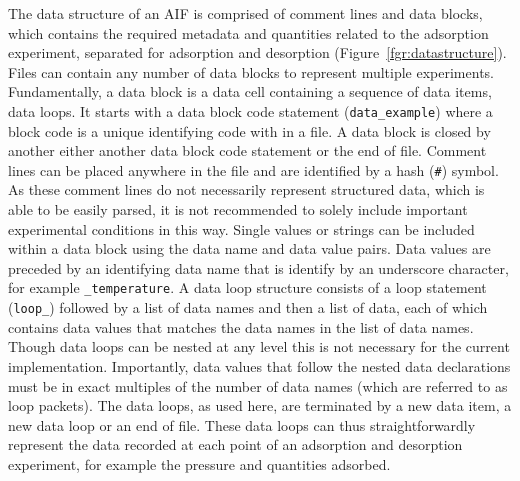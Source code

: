 \documentclass[journal=langd5,manuscript=article]{achemso}
\begin{document}
The data structure of an AIF is comprised of comment lines and data blocks, which contains the required metadata and quantities related to the adsorption experiment, separated for adsorption and desorption (Figure~\ref{fgr:datastructure}).
Files can contain any number of data blocks to represent multiple experiments.
Fundamentally, a data block is a data cell containing a sequence of data items, data loops.
It starts with a data block code statement (\texttt{data\_example}) where a block code is a unique identifying code with in a file.
A data block is closed by another either another data block code statement or the end of file.
Comment lines can be placed anywhere in the file and are identified by a hash (\texttt{\#}) symbol.
As these comment lines do not necessarily represent structured data, which is able to be easily parsed, it is not recommended to solely include important experimental conditions in this way.
Single values or strings can be included within a data block using the data name and data value pairs.
Data values are preceded by an identifying data name that is identify by an underscore character, for example \texttt{\_temperature}.
A data loop structure consists of a loop statement (\texttt{loop\_}) followed by a list of data names and then a list of data, each of which contains data values that matches the data names in the list of data names. 
Though data loops can be nested at any level this is not necessary for the current implementation.
Importantly, data values that follow the nested data declarations must be in exact multiples of the number of data names (which are referred to as loop packets).
The data loops, as used here, are terminated by a new data item, a new data loop or an end of file.
These data loops can thus straightforwardly represent the data recorded at each point of an adsorption and desorption experiment, for example the pressure and quantities adsorbed.
\end{document}
